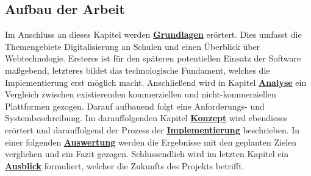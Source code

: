 \newpage

\subsection{Aufbau der Arbeit}
Im Anschluss an dieses Kapitel werden \hyperref[sec:grundlagen]{\textbf{Grundlagen}} erörtert. Dies umfasst die Themengebiete Digitalisierung an Schulen und einen Überblick über Webtechnologie. Ersteres ist für den späteren potentiellen Einsatz der Software maßgebend, letzteres bildet das technologische Fundament, welches die Implementierung erst möglich macht. Anschließend wird in Kapitel \hyperref[sec:analyse]{\textbf{Analyse}} ein Vergleich zwischen existierenden kommerziellen und nicht-kommerziellen Plattformen gezogen. Darauf aufbauend folgt eine Anforderungs- und Systembeschreibung. Im darauffolgenden Kapitel \hyperref[sec:konzept]{ \textbf{Konzept}} wird ebendieses erörtert und darauffolgend der Prozess der \hyperref[sec:implementierung]{\textbf{Implementierung}} beschrieben. In einer folgenden \hyperref[sec:auswertung]{\textbf{Auswertung}} werden die Ergebnisse mit den geplanten Zielen verglichen und ein Fazit gezogen. Schlussendlich wird im letzten Kapitel ein \hyperref[sec:ausblick]{\textbf{Ausblick}} formuliert, welcher die Zukunfts des Projekts betrifft. 
   

